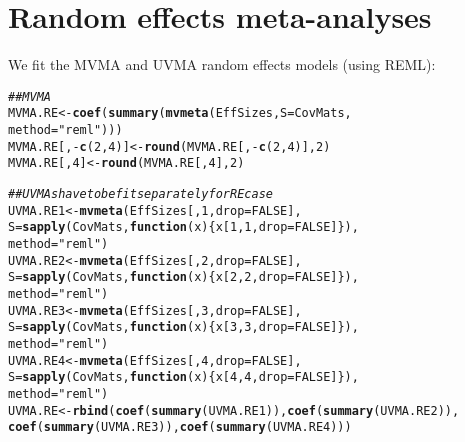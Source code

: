 \documentclass{article}\usepackage[]{graphicx}\usepackage[]{color}
\makeatletter
\newcommand{\hlnum}[1]{\textcolor[rgb]{0.686,0.059,0.569}{#1}}%
\newcommand{\hlstr}[1]{\textcolor[rgb]{0.192,0.494,0.8}{#1}}%
\newcommand{\hlcom}[1]{\textcolor[rgb]{0.678,0.584,0.686}{\textit{#1}}}%
\newcommand{\hlopt}[1]{\textcolor[rgb]{0,0,0}{#1}}%
\newcommand{\hlstd}[1]{\textcolor[rgb]{0.345,0.345,0.345}{#1}}%
\newcommand{\hlkwa}[1]{\textcolor[rgb]{0.161,0.373,0.58}{\textbf{#1}}}%
\newcommand{\hlkwb}[1]{\textcolor[rgb]{0.69,0.353,0.396}{#1}}%
\newcommand{\hlkwc}[1]{\textcolor[rgb]{0.333,0.667,0.333}{#1}}%
\newcommand{\hlkwd}[1]{\textcolor[rgb]{0.737,0.353,0.396}{\textbf{#1}}}%
\newenvironment{kframe}{%
 \def\at@end@of@kframe{}%
 \ifinner\ifhmode%
  \def\at@end@of@kframe{\end{minipage}}%
  \begin{minipage}{\columnwidth}%
 \fi\fi%
 \def\FrameCommand##1{\hskip\@totalleftmargin \hskip-\fboxsep
 \colorbox{shadecolor}{##1}\hskip-\fboxsep
     \hskip-\linewidth \hskip-\@totalleftmargin \hskip\columnwidth}%
 \MakeFramed {\advance\hsize-\width
   \@totalleftmargin\z@ \linewidth\hsize
   \@setminipage}}%
 {\par\unskip\endMakeFramed%
 \at@end@of@kframe}
\newenvironment{knitrout}{}{} %
\makeatother
\begin{document}
\section{Random effects meta-analyses}

We fit the MVMA and UVMA random effects models (using REML):
\begin{knitrout}
\color{fgcolor}\begin{kframe}
\begin{alltt}
\hlcom{##MVMA}
\hlstd{MVMA.RE} \hlkwb{<-} \hlkwd{coef}\hlstd{(}\hlkwd{summary}\hlstd{(}\hlkwd{mvmeta}\hlstd{(EffSizes,} \hlkwc{S} \hlstd{= CovMats,}
                               \hlkwc{method}\hlstd{=}\hlstr{"reml"}\hlstd{)))}
\hlstd{MVMA.RE[,} \hlopt{-}\hlkwd{c}\hlstd{(}\hlnum{2}\hlstd{,}\hlnum{4}\hlstd{)]} \hlkwb{<-} \hlkwd{round}\hlstd{(MVMA.RE[,} \hlopt{-}\hlkwd{c}\hlstd{(}\hlnum{2}\hlstd{,}\hlnum{4}\hlstd{)],} \hlnum{2}\hlstd{)}
\hlstd{MVMA.RE[,} \hlnum{4}\hlstd{]} \hlkwb{<-} \hlkwd{round}\hlstd{(MVMA.RE[,} \hlnum{4}\hlstd{],} \hlnum{2}\hlstd{)}

\hlcom{##UVMAs have to be fit separately for RE case}
\hlstd{UVMA.RE1} \hlkwb{<-} \hlkwd{mvmeta}\hlstd{(EffSizes[,}\hlnum{1}\hlstd{,}\hlkwc{drop}\hlstd{=}\hlnum{FALSE}\hlstd{],}
                   \hlkwc{S} \hlstd{=} \hlkwd{sapply}\hlstd{(CovMats,} \hlkwa{function}\hlstd{(}\hlkwc{x}\hlstd{)\{x[}\hlnum{1}\hlstd{,}\hlnum{1}\hlstd{,}\hlkwc{drop}\hlstd{=}\hlnum{FALSE}\hlstd{]\}),}
                   \hlkwc{method}\hlstd{=}\hlstr{"reml"}\hlstd{)}
\hlstd{UVMA.RE2} \hlkwb{<-} \hlkwd{mvmeta}\hlstd{(EffSizes[,}\hlnum{2}\hlstd{,}\hlkwc{drop}\hlstd{=}\hlnum{FALSE}\hlstd{],}
                   \hlkwc{S} \hlstd{=} \hlkwd{sapply}\hlstd{(CovMats,} \hlkwa{function}\hlstd{(}\hlkwc{x}\hlstd{)\{x[}\hlnum{2}\hlstd{,}\hlnum{2}\hlstd{,}\hlkwc{drop}\hlstd{=}\hlnum{FALSE}\hlstd{]\}),}
                   \hlkwc{method}\hlstd{=}\hlstr{"reml"}\hlstd{)}
\hlstd{UVMA.RE3} \hlkwb{<-} \hlkwd{mvmeta}\hlstd{(EffSizes[,}\hlnum{3}\hlstd{,}\hlkwc{drop}\hlstd{=}\hlnum{FALSE}\hlstd{],}
                   \hlkwc{S} \hlstd{=} \hlkwd{sapply}\hlstd{(CovMats,} \hlkwa{function}\hlstd{(}\hlkwc{x}\hlstd{)\{x[}\hlnum{3}\hlstd{,}\hlnum{3}\hlstd{,}\hlkwc{drop}\hlstd{=}\hlnum{FALSE}\hlstd{]\}),}
                   \hlkwc{method}\hlstd{=}\hlstr{"reml"}\hlstd{)}
\hlstd{UVMA.RE4} \hlkwb{<-} \hlkwd{mvmeta}\hlstd{(EffSizes[,}\hlnum{4}\hlstd{,}\hlkwc{drop}\hlstd{=}\hlnum{FALSE}\hlstd{],}
                   \hlkwc{S} \hlstd{=} \hlkwd{sapply}\hlstd{(CovMats,} \hlkwa{function}\hlstd{(}\hlkwc{x}\hlstd{)\{x[}\hlnum{4}\hlstd{,}\hlnum{4}\hlstd{,}\hlkwc{drop}\hlstd{=}\hlnum{FALSE}\hlstd{]\}),}
                   \hlkwc{method}\hlstd{=}\hlstr{"reml"}\hlstd{)}
\hlstd{UVMA.RE} \hlkwb{<-} \hlkwd{rbind}\hlstd{(}\hlkwd{coef}\hlstd{(}\hlkwd{summary}\hlstd{(UVMA.RE1)),} \hlkwd{coef}\hlstd{(}\hlkwd{summary}\hlstd{(UVMA.RE2)),}
                 \hlkwd{coef}\hlstd{(}\hlkwd{summary}\hlstd{(UVMA.RE3)),} \hlkwd{coef}\hlstd{(}\hlkwd{summary}\hlstd{(UVMA.RE4)))}


\end{alltt}
\end{kframe}
\end{knitrout}
\end{document}
